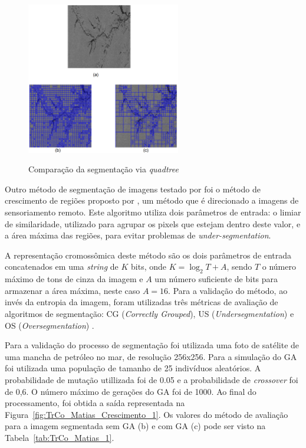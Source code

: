 \documentclass[12pt,oneside,a4paper,english,french,spanish,brazil,]{abntex2}
\begin{document}
\begin{figure}[ht]
\centering
\caption{Comparação da segmentação via \textit{quadtree}}
\includegraphics[width=0.6\textwidth]{imagens/TrCo_Matias_Quadtree_1.PNG}
\label{fig:TrCo_Matias_Quadtree_1}
\end{figure}

Outro método de segmentação de imagens testado por \citet{matias:2007} foi o método de crescimento de regiões proposto por \citet{bins:1996}, um método que é direcionado a imagens de sensoriamento remoto. Este algoritmo utiliza dois parâmetros de entrada: o limiar de similaridade, utilizado para agrupar os pixels que estejam dentro deste valor, e a área máxima das regiões, para evitar problemas de \textit{under-segmentation}.

A representação cromossômica deste método são os dois parâmetros de entrada concatenados em uma \textit{string} de \(K\) bits, onde \(K = \log_2 T + A\), sendo \(T\) o número máximo de tons de cinza da imagem e \(A\) um número suficiente de bits para armazenar a área máxima, neste caso \(A = 16\). Para a validação do método, ao invés da entropia da imagem, foram utilizadas três métricas de avaliação de algoritmos de segmentação: CG (\textit{Correctly Grouped}), US (\textit{Undersegmentation}) e OS (\textit{Oversegmentation}) \cite{roli:2005}.

Para a validação do processo de segmentação foi utilizada uma foto de satélite de uma mancha de petróleo no mar, de resolução 256x256. Para a simulação do GA foi utilizada uma população de tamanho de 25 indivíduos aleatórios. A probabilidade de mutação utillizada foi de 0.05 e a probabilidade de \textit{crossover} foi de 0,6. O número máximo de gerações do GA foi de 1000. Ao final do processamento, foi obtida a saída representada na Figura~\ref{fig:TrCo_Matias_Crescimento_1}. Os valores do método de avaliação para a imagem segmentada sem GA (b) e com GA (c) pode ser visto na Tabela~\ref{tab:TrCo_Matias_1}.
\end{document}
